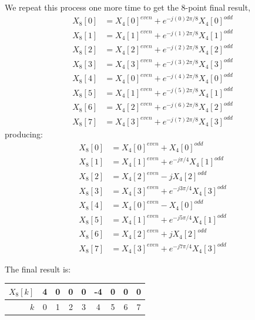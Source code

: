 We repeat this process one more time to get the 8-point final result,
\begin{align*}
  X_8[0] &= X_4[0]^{\mathit{even}} +  e^{-j(0)2\pi/8}X_4[0]^{\mathit{odd}} \\
  X_8[1] &= X_4[1]^{\mathit{even}} +  e^{-j(1)2\pi/8}X_4[1]^{\mathit{odd}} \\
  X_8[2] &= X_4[2]^{\mathit{even}} +  e^{-j(2)2\pi/8}X_4[2]^{\mathit{odd}} \\
  X_8[3] &= X_4[3]^{\mathit{even}} +  e^{-j(3)2\pi/8}X_4[3]^{\mathit{odd}} \\
  X_8[4] &= X_4[0]^{\mathit{even}} +  e^{-j(4)2\pi/8}X_4[0]^{\mathit{odd}} \\
  X_8[5] &= X_4[1]^{\mathit{even}} +  e^{-j(5)2\pi/8}X_4[1]^{\mathit{odd}} \\
  X_8[6] &= X_4[2]^{\mathit{even}} +  e^{-j(6)2\pi/8}X_4[2]^{\mathit{odd}} \\
  X_8[7] &= X_4[3]^{\mathit{even}} +  e^{-j(7)2\pi/8}X_4[3]^{\mathit{odd}}
\end{align*}
producing:
\begin{align*}
  X_8[0] &= X_4[0]^{\mathit{even}} +  X_4[0]^{\mathit{odd}} \\
  X_8[1] &= X_4[1]^{\mathit{even}} +  e^{-j\pi/4}X_4[1]^{\mathit{odd}} \\
  X_8[2] &= X_4[2]^{\mathit{even}} -  j X_4[2]^{\mathit{odd}} \\
  X_8[3] &= X_4[3]^{\mathit{even}} +  e^{-j3\pi/4}X_4[3]^{\mathit{odd}} \\
  X_8[4] &= X_4[0]^{\mathit{even}} -  X_4[0]^{\mathit{odd}} \\
  X_8[5] &= X_4[1]^{\mathit{even}} +  e^{-j5\pi/4}X_4[1]^{\mathit{odd}} \\
  X_8[6] &= X_4[2]^{\mathit{even}} +  jX_4[2]^{\mathit{odd}} \\
  X_8[7] &= X_4[3]^{\mathit{even}} +  e^{-j7\pi/4}X_4[3]^{\mathit{odd}}
\end{align*}

The final result is:
\begin{center}
  \begin{tabular}{r|c|c|c|c|c|c|c|c|} \hline
    $X_8[k]$ & 4   & 0   & 0   & 0   & -4  & 0   & 0   & 0   \\ \hline
    $k$        & 0   & 1   & 2   & 3   & 4   & 5   & 6   & 7   \\ \hline
  \end{tabular}
\end{center}

